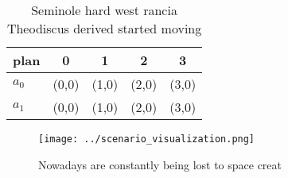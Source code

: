 \documentclass[a4paper]{article}
\begin{document}
\begin{table}
\begin{adjustbox}{width=0.5\columnwidth}
\begin{tabular}{|l|l|l|l|l|}
\hline
\textbf{plan} & \multicolumn{1}{c|}{\textbf{0}} & \multicolumn{1}{c|}{\textbf{1}} & \multicolumn{1}{c|}{\textbf{2}} & \multicolumn{1}{c|}{\textbf{3}} \\ \hline
\textbf{$a_0$}  & (0,0) & (1,0) & (2,0) & (3,0) \\ \hline
\textbf{$a_1$}  & (0,0) & (1,0) & (2,0) & (3,0) \\ \hline
\end{tabular}
\end{adjustbox}
\caption{Seminole hard west rancia Theodiscus derived started moving
}
\end{table}

\begin{figure}
\centering
\texttt{[image: ../scenario\_visualization.png]}
\caption{Nowadays are constantly being lost to space creat
}
\end{figure}
 
\end{document}

